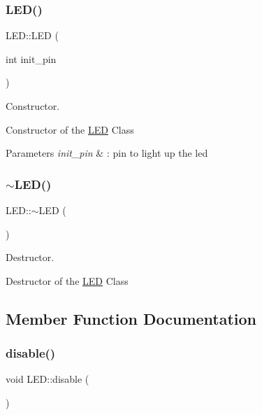 \subsubsection{\texorpdfstring{L\+E\+D()}{LED()}}
{\footnotesize\ttfamily L\+E\+D\+::\+L\+ED (\begin{DoxyParamCaption}\item[{int}]{init\+\_\+pin }\end{DoxyParamCaption})}



Constructor. 

Constructor of the \hyperlink{class_l_e_d}{L\+ED} Class\textquotesingle{}


\begin{DoxyParams}{Parameters}
{\em init\+\_\+pin} & \+: pin to light up the led \\
\hline
\end{DoxyParams}
\mbox{\label{class_l_e_d_a5cb49cf2696615d43952baf8ade06767}} 
\subsubsection{\texorpdfstring{$\sim$\+L\+E\+D()}{~LED()}}
{\footnotesize\ttfamily L\+E\+D\+::$\sim$\+L\+ED (\begin{DoxyParamCaption}{ }\end{DoxyParamCaption})}



Destructor. 

Destructor of the \hyperlink{class_l_e_d}{L\+ED} Class\textquotesingle{} 

\subsection{Member Function Documentation}
\mbox{\label{class_l_e_d_a96e732b7178a9d961fb3bec0078fc2bc}} 
\subsubsection{\texorpdfstring{disable()}{disable()}}
{\footnotesize\ttfamily void L\+E\+D\+::disable (\begin{DoxyParamCaption}{ }\end{DoxyParamCaption})}




